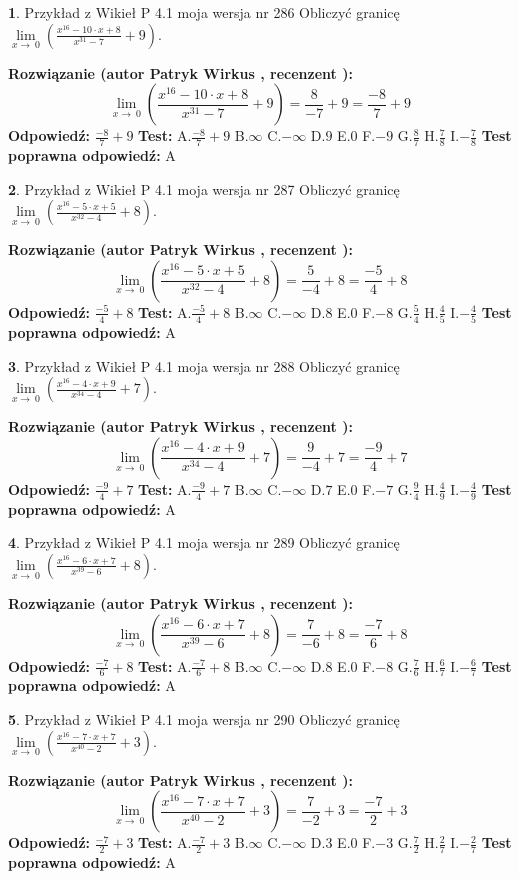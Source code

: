 \documentclass[12pt, a4paper]{article}
\theoremstyle{definition} %
\newtheorem{zad}{}
\newcommand{\zadStart}[1]{\begin{zad}#1\newline}
\newcommand{\zadStop}{\end{zad}}
\newcommand{\rozwStart}[2]{\noindent \textbf{Rozwiązanie (autor #1 , recenzent #2): }\newline}
\newcommand{\rozwStop}{\newline}
\newcommand{\odpStart}{\noindent \textbf{Odpowiedź:}\newline}
\newcommand{\odpStop}{\newline}
\newcommand{\testStart}{\noindent \textbf{Test:}\newline}
\newcommand{\testStop}{\newline}
\newcommand{\kluczStart}{\noindent \textbf{Test poprawna odpowiedź:}\newline}
\newcommand{\kluczStop}{\newline}
\begin{document}
\zadStart{Przykład z Wikieł P 4.1 moja wersja nr 286}
Obliczyć granicę $\lim\limits_{x\to\ 0}(\frac{x^{16}-10 \cdot x +8}{x^{31}-7}+9)$.
\zadStop
\rozwStart{Patryk Wirkus}{}
$$\lim\limits_{x\to\ 0}(\frac{x^{16}-10 \cdot x +8}{x^{31}-7}+9)=\frac{8}{-7}+9=\frac{-8}{7}+9$$
\rozwStop
\odpStart
$\frac{-8}{7}+9$
\odpStop
\testStart
A.$\frac{-8}{7}+9$
B.$\infty$
C.$-\infty$
D.$9$
E.$0$
F.$-9$
G.$\frac{8}{7}$
H.$\frac{7}{8}$
I.$-\frac{7}{8}$
\testStop
\kluczStart
A
\kluczStop



\zadStart{Przykład z Wikieł P 4.1 moja wersja nr 287}
Obliczyć granicę $\lim\limits_{x\to\ 0}(\frac{x^{16}-5 \cdot x +5}{x^{32}-4}+8)$.
\zadStop
\rozwStart{Patryk Wirkus}{}
$$\lim\limits_{x\to\ 0}(\frac{x^{16}-5 \cdot x +5}{x^{32}-4}+8)=\frac{5}{-4}+8=\frac{-5}{4}+8$$
\rozwStop
\odpStart
$\frac{-5}{4}+8$
\odpStop
\testStart
A.$\frac{-5}{4}+8$
B.$\infty$
C.$-\infty$
D.$8$
E.$0$
F.$-8$
G.$\frac{5}{4}$
H.$\frac{4}{5}$
I.$-\frac{4}{5}$
\testStop
\kluczStart
A
\kluczStop



\zadStart{Przykład z Wikieł P 4.1 moja wersja nr 288}
Obliczyć granicę $\lim\limits_{x\to\ 0}(\frac{x^{16}-4 \cdot x +9}{x^{34}-4}+7)$.
\zadStop
\rozwStart{Patryk Wirkus}{}
$$\lim\limits_{x\to\ 0}(\frac{x^{16}-4 \cdot x +9}{x^{34}-4}+7)=\frac{9}{-4}+7=\frac{-9}{4}+7$$
\rozwStop
\odpStart
$\frac{-9}{4}+7$
\odpStop
\testStart
A.$\frac{-9}{4}+7$
B.$\infty$
C.$-\infty$
D.$7$
E.$0$
F.$-7$
G.$\frac{9}{4}$
H.$\frac{4}{9}$
I.$-\frac{4}{9}$
\testStop
\kluczStart
A
\kluczStop



\zadStart{Przykład z Wikieł P 4.1 moja wersja nr 289}
Obliczyć granicę $\lim\limits_{x\to\ 0}(\frac{x^{16}-6 \cdot x +7}{x^{39}-6}+8)$.
\zadStop
\rozwStart{Patryk Wirkus}{}
$$\lim\limits_{x\to\ 0}(\frac{x^{16}-6 \cdot x +7}{x^{39}-6}+8)=\frac{7}{-6}+8=\frac{-7}{6}+8$$
\rozwStop
\odpStart
$\frac{-7}{6}+8$
\odpStop
\testStart
A.$\frac{-7}{6}+8$
B.$\infty$
C.$-\infty$
D.$8$
E.$0$
F.$-8$
G.$\frac{7}{6}$
H.$\frac{6}{7}$
I.$-\frac{6}{7}$
\testStop
\kluczStart
A
\kluczStop



\zadStart{Przykład z Wikieł P 4.1 moja wersja nr 290}
Obliczyć granicę $\lim\limits_{x\to\ 0}(\frac{x^{16}-7 \cdot x +7}{x^{40}-2}+3)$.
\zadStop
\rozwStart{Patryk Wirkus}{}
$$\lim\limits_{x\to\ 0}(\frac{x^{16}-7 \cdot x +7}{x^{40}-2}+3)=\frac{7}{-2}+3=\frac{-7}{2}+3$$
\rozwStop
\odpStart
$\frac{-7}{2}+3$
\odpStop
\testStart
A.$\frac{-7}{2}+3$
B.$\infty$
C.$-\infty$
D.$3$
E.$0$
F.$-3$
G.$\frac{7}{2}$
H.$\frac{2}{7}$
I.$-\frac{2}{7}$
\testStop
\kluczStart
A
\kluczStop
\end{document}
